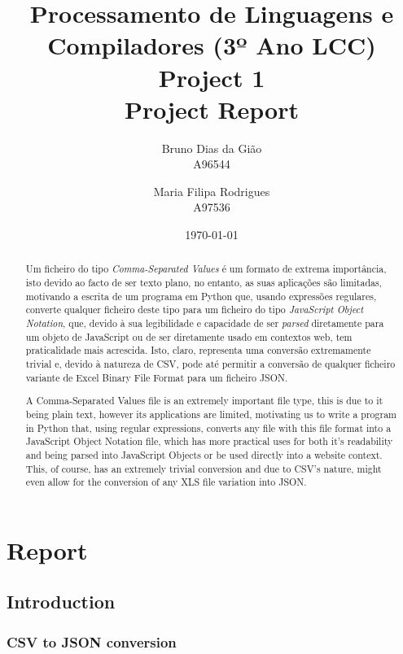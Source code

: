 \documentclass[11pt,a4paper,times]{report}
\title{Processamento de Linguagens e Compiladores (3º Ano LCC)\\ 
      \textbf{Project 1} \\ Project Report
      }
\date{\today}
\author{Bruno Dias da Gião\\ A96544 \and Maria Filipa Rodrigues \\ A97536}
\def\CSV{Comma-Separated Values\xspace}
\def\JSON{JavaScript Object Notation\xspace}
\def\XLS{Excel Binary File Format\xspace}
\begin{document}
\maketitle

\begin{abstract}
Um ficheiro do tipo \textit{\CSV} é um formato de extrema importância, 
isto devido ao facto de ser texto plano, no entanto, as suas aplicações
são limitadas, motivando a escrita de um programa em Python que, 
usando expressões regulares, converte qualquer ficheiro deste tipo para 
um ficheiro do tipo \textit{\JSON}, que, devido à sua legibilidade e 
capacidade de ser \textit{parsed} diretamente para um objeto de 
JavaScript ou de ser diretamente usado em contextos web, tem 
praticalidade mais acrescida. Isto, claro, representa uma conversão 
extremamente trivial e, devido à natureza de CSV, pode até permitir a
conversão de qualquer ficheiro variante de \XLS para um ficheiro JSON.
\end{abstract}
\begin{abstract}
A \CSV file is an extremely important file type, this is due to it being 
plain text, however its applications are limited, motivating us to 
write a program in Python that, using regular expressions, 
converts any file with this file format into a \JSON file, which has more
practical uses for both it's readability and being parsed into JavaScript
Objects or be used directly into a website context. This, of course, has 
an extremely trivial conversion and due to CSV's nature, might even
allow for the conversion of any XLS file variation into JSON.
\end{abstract}

\tableofcontents

\chapter{Report} \label{chap:report}
\section{Introduction} \label{intro} 
\subsection{CSV to JSON conversion}
\end{document}
